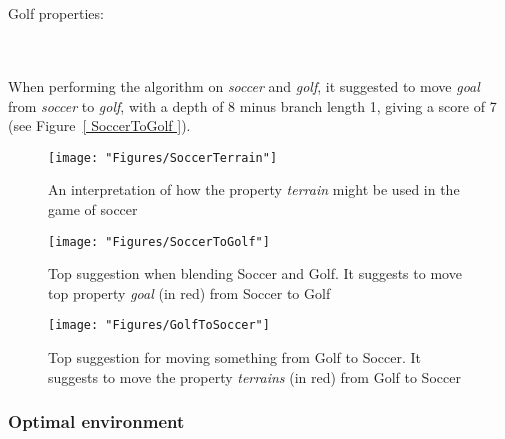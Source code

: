 \noindent{}
\\\\Golf properties:
	
\noindent{}
\\\\When performing the algorithm on \emph{soccer} and \emph{golf}, it suggested to move \emph{goal} from \emph{soccer} to \emph{golf}, with a depth of 8 minus branch length 1, giving a score of 7 (see Figure~\ref{ SoccerToGolf }).


\begin{figure} \centering \texttt{[image: "Figures/SoccerTerrain"]} \caption{An interpretation of how the property \emph{terrain} might be used in the game of soccer} \label{fig:SoccerTerrain} \end{figure}

\begin{figure} \centering \texttt{[image: "Figures/SoccerToGolf"]} \caption{Top suggestion when blending Soccer and Golf. It suggests to move top property \emph{goal} (in red) from Soccer to Golf } \label{fig:SoccerToGolf} \end{figure}

\begin{figure} \centering \texttt{[image: "Figures/GolfToSoccer"]} \caption{Top suggestion for moving something from Golf to Soccer. It suggests to move the property \emph{terrains} (in red) from Golf to Soccer } \label{fig:GolfToSoccer} \end{figure}

\subsubsection{Optimal environment}



